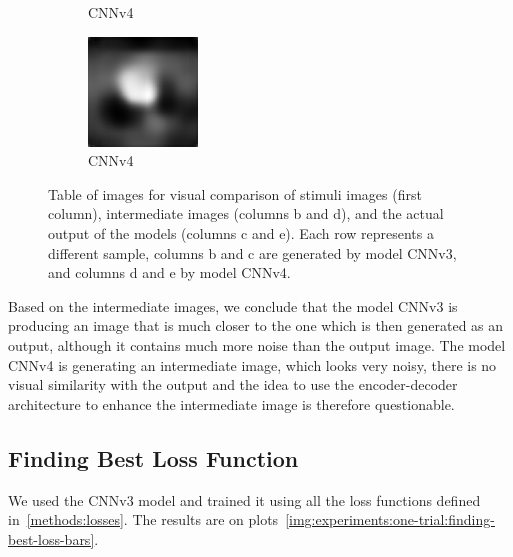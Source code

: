 \begin{figure}[H]
\begin{subfigure}[t]{0.13\textwidth}
    \caption{CNNv4}
  \end{subfigure}
  \begin{subfigure}[t]{0.13\textwidth}
    \centering
    \includegraphics[width=\linewidth]{img/one-trial/intermediate-cnnv4/prediction_3.png}
    \caption{CNNv4}
  \end{subfigure}
  
\caption{Table of images for visual comparison of stimuli images (first column), intermediate images (columns b and d), and the actual output of the models (columns c and e). Each row represents a different sample, columns b and c are generated by model CNNv3, and columns d and e by model CNNv4.}
\label{img:experiments:one-trial:intermediate-image}
\end{figure}

Based on the intermediate images, we conclude that the model CNNv3 is producing an image that is much closer to the one which is then generated as an output, although it contains much more noise than the output image. The model CNNv4 is generating an intermediate image, which looks very noisy, there is no visual similarity with the output and the idea to use the encoder-decoder architecture to enhance the intermediate image is therefore questionable.


\subsection{Finding Best Loss Function}
\label{experiments:one-trial:finding-best-loss}
We used the CNNv3 model and trained it using all the loss functions defined in~\ref{methods:losses}. The results are on plots~\ref{img:experiments:one-trial:finding-best-loss-bars}.

